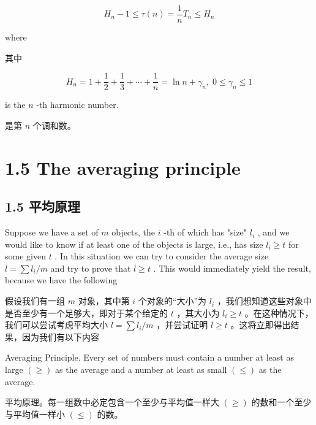 \documentclass[10pt]{article}
\begin{document}
\[
{H}_{n} - 1 \leq  \tau \left( n\right)  = \frac{1}{n}{T}_{n} \leq  {H}_{n}
\]

where

\begin{tcolorbox}\relax
其中
\end{tcolorbox}

\[
{H}_{n} = 1 + \frac{1}{2} + \frac{1}{3} + \cdots  + \frac{1}{n} = \ln n + {\gamma }_{n},\;0 \leq  {\gamma }_{n} \leq  1 \tag{1.13}
\]

is the \(n\) -th harmonic number.

\begin{tcolorbox}\relax
是第 \(n\) 个调和数。
\end{tcolorbox}

\section*{1.5 The averaging principle}

\begin{tcolorbox}\relax
\section*{1.5 平均原理}
\end{tcolorbox}

Suppose we have a set of \(m\) objects, the \(i\) -th of which has "size" \({l}_{i}\) , and we would like to know if at least one of the objects is large, i.e., has size \({l}_{i} \geq  t\) for some given \(t\) . In this situation we can try to consider the average size \(\bar{l} = \sum {l}_{i}/m\) and try to prove that \(\bar{l} \geq  t\) . This would immediately yield the result, because we have the following

\begin{tcolorbox}\relax
假设我们有一组 \(m\) 对象，其中第 \(i\) 个对象的“大小”为 \({l}_{i}\) ，我们想知道这些对象中是否至少有一个足够大，即对于某个给定的 \(t\) ，其大小为 \({l}_{i} \geq  t\) 。在这种情况下，我们可以尝试考虑平均大小 \(\bar{l} = \sum {l}_{i}/m\) ，并尝试证明 \(\bar{l} \geq  t\) 。这将立即得出结果，因为我们有以下内容
\end{tcolorbox}

Averaging Principle. Every set of numbers must contain a number at least as large \(\left(  \geq  \right)\) as the average and a number at least as small \(\left(  \leq  \right)\) as the average.

\begin{tcolorbox}\relax
平均原理。每一组数中必定包含一个至少与平均值一样大 \(\left(  \geq  \right)\) 的数和一个至少与平均值一样小 \(\left(  \leq  \right)\) 的数。
\end{tcolorbox}
\end{document}
